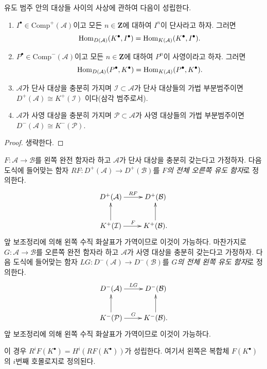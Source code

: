\begin{lemma}
\label{lemma-derived-categories}
유도 범주 안의 대상들 사이의 사상에 관하여 다음이 성립한다.
\begin{enumerate}
\item
$I^\bullet \in \text{Comp}^+(\mathcal{A})$이고 모든
$n \in \mathbf{Z}$에 대하여 $I^n$이 단사라고 하자. 그러면
$$
\mathop{\mathrm{Hom}}\nolimits_{D(\mathcal{A})}(K^\bullet, I^\bullet)
=
\mathop{\mathrm{Hom}}\nolimits_{K(\mathcal{A})}(K^\bullet, I^\bullet).
$$
\item
$P^\bullet \in \text{Comp}^-(\mathcal{A})$이고 모든
$n \in \mathbf{Z}$에 대하여 $P^n$이 사영이라고 하자. 그러면
$$
\mathop{\mathrm{Hom}}\nolimits_{D(\mathcal{A})}(P^\bullet, K^\bullet)
=
\mathop{\mathrm{Hom}}\nolimits_{K(\mathcal{A})}(P^\bullet, K^\bullet).
$$
\item
$\mathcal{A}$가 단사 대상을 충분히 가지며
$\mathcal{I} \subset \mathcal{A}$가 단사 대상들의 가법 부분범주이면
$
D^+(\mathcal{A})\cong K^+(\mathcal{I})
$
이다(삼각 범주로서).
\item
$\mathcal{A}$가 사영 대상을 충분히 가지며
$\mathcal{P} \subset \mathcal{A}$가 사영 대상들의 가법 부분범주이면
$
D^-(\mathcal{A}) \cong K^-(\mathcal{P}).
$
\end{enumerate}
\end{lemma}

\begin{proof}
생략한다.
\end{proof}

\begin{definition}
\label{definition-derived-functor}
$F: \mathcal{A} \to \mathcal{B}$를 왼쪽 완전 함자라 하고
$\mathcal{A}$가 단사 대상을 충분히 갖는다고 가정하자. 다음 도식에
들어맞는 함자 $RF: D^+(\mathcal{A}) \to D^+(\mathcal{B})$를
{\it $F$의 전체 오른쪽 유도 함자}로 정의한다.
$$
\xymatrix{
D^+(\mathcal{A}) \ar[r]^{RF} & D^+(\mathcal{B}) \\
K^+(\mathcal I) \ar[u] \ar[r]^F & K^+(\mathcal{B}). \ar[u]
}
$$
앞 보조정리에 의해 왼쪽 수직 화살표가 가역이므로 이것이 가능하다.
마찬가지로 $G: \mathcal{A} \to \mathcal{B}$를 오른쪽 완전 함자라 하고
$\mathcal{A}$가 사영 대상을 충분히 갖는다고 가정하자. 다음 도식에
들어맞는 함자 $LG: D^-(\mathcal{A}) \to D^-(\mathcal{B})$를
{\it $G$의 전체 왼쪽 유도 함자}로 정의한다.
$$
\xymatrix{
D^-(\mathcal{A}) \ar[r]^{LG} & D^-(\mathcal{B}) \\
K^-(\mathcal{P}) \ar[u] \ar[r]^G & K^-(\mathcal{B}). \ar[u]
}
$$
앞 보조정리에 의해 왼쪽 수직 화살표가 가역이므로 이것이 가능하다.
\end{definition}

\begin{remark}
\label{remark-cohomology-of-derived-functor}
이 경우 $R^iF(K^\bullet) = H^i(RF(K^\bullet))$가 성립한다. 여기서
왼쪽은 복합체 $F(K^\bullet)$의 $i$번째 호몰로지로 정의된다.
\end{remark}

